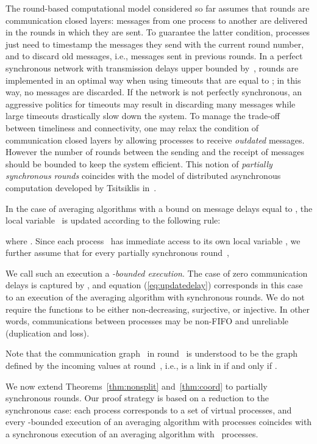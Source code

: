 \documentclass[a4paper]{article}
\theoremstyle{newthm}
\begin{document}
The round-based computational model considered so far assumes that rounds are communication 
	closed layers: messages from one process to another are delivered in the rounds in which 
	they are sent.
To guarantee the latter condition, processes just need to timestamp the messages 
	they send with  the current round number, and to discard old messages, 
	i.e., messages sent in previous rounds.
In  a perfect synchronous network with  transmission delays upper bounded by~, rounds are implemented in
	an optimal way when using  timeouts that are
	equal to ;  in this way, no messages are discarded.
If the network is not perfectly synchronous, an aggressive politics for timeouts may result in
	discarding many messages while large timeouts drastically slow down the system.
To manage the trade-off between timeliness and connectivity, one may relax the condition
	of communication closed layers by allowing processes to receive {\em outdated} messages.
However the number of rounds between the sending and the receipt of messages 
	should be bounded  to keep the system efficient.
This notion of  {\em partially synchronous rounds} coincides with the model of distributed asynchronous computation
	developed by Tsitsiklis in~\cite{Tsi84,BT89}.

In the case of averaging algorithms with a bound on message delays equal to , the local variable~ is updated according to the
	following rule:
	
	where .
Since each process~ has  immediate access to its own local variable ,  we further
	assume that for every partially synchronous round~,
	
We call such an execution a {\em -bounded execution}.
The case of zero communication delays is captured by , and equation (\ref{eq:updatedelay}) corresponds 
	in this case to an execution of the averaging algorithm with synchronous rounds.
We do not require the functions  to be either non-decreasing, surjective, or injective.
In other words, communications between processes may be non-FIFO and unreliable (duplication and loss). 

Note that the communication graph~ in round~ is understood to be the
	graph defined by the incoming values at round~, i.e.,  is a link in  
	if and only if .


We now extend Theorems~\ref{thm:nonsplit} and~\ref{thm:coord} to
	partially synchronous rounds.
Our proof strategy is based on a reduction to the synchronous case:
	each process corresponds to a set of  virtual processes, and 
	every  -bounded execution of an averaging algorithm 
	with  processes coincides with a synchronous execution
	of an averaging algorithm with~ processes.
\end{document}
